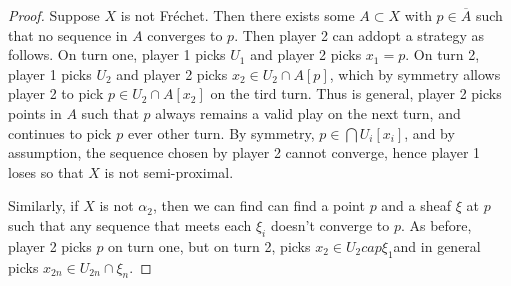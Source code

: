 \documentclass{article}
\begin{document}
\begin{proof}
    Suppose \(X\) is not Fréchet. Then there exists some \(A \subset X\) with \(p \in \overline{A}\) such that no sequence in \(A\) converges to \(p\). Then player 2 can addopt a strategy as follows. On turn one, player 1 picks \(U_1\) and player 2 picks \(x_1 = p\). On turn 2, player 1 picks \(U_2\) and player 2 picks \(x_2 \in U_2\cap A[p] \), which by symmetry allows player 2 to pick \(p \in U_2\cap A[x_2]\) on the tird turn. Thus is general, player 2 picks points in \(A\) such that \(p\) always remains a valid play on the next turn, and continues to pick \(p\) ever other turn. By symmetry, \(p \in \bigcap U_i[x_i]\), and by assumption, the sequence chosen by player 2 cannot converge, hence player 1 loses so that \(X\) is not semi-proximal.

    Similarly, if \(X\) is not \(\alpha_2\), then we can find can find a point \(p\) and a sheaf \(\xi\) at \(p\) such that any sequence that meets each \(\xi_i\) doesn't converge to \(p\). As before, player 2 picks \(p\) on turn one, but on turn 2, picks \(x_2 \in U_2 cap \xi_1\)and in general picks \(x_{2n} \in U_{2n}\cap\xi_{n}\). 
\end{proof}
\end{document}
